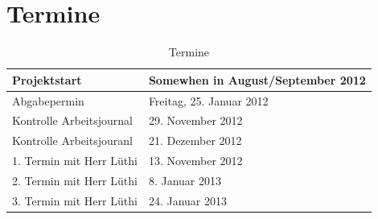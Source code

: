 \documentclass[11pt,paper=a4,final]{scrartcl}
\begin{document}
\section{Termine}
\label{sec:termine}
\begin{table}[h!]
  \centering
  \begin{tabular}{|l|l|}\hline
    Projektstart & Somewhen in August/September 2012 \\ \hline
    Abgabepermin & Freitag, 25. Januar 2012 \\ \hline
    Kontrolle Arbeitsjournal & 29. November 2012 \\ \hline
    Kontrolle Arbeitsjouranl & 21. Dezember 2012 \\ \hline
    1. Termin mit Herr L\"uthi & 13. November 2012 \\ \hline
    2. Termin mit Herr L\"uthi & 8. Januar 2013 \\ \hline
    3. Termin mit Herr L\"uthi & 24. Januar 2013 \\ \hline
  \end{tabular}
  \caption{Termine}
  \label{tab:termine}
\end{table}
\end{document}
